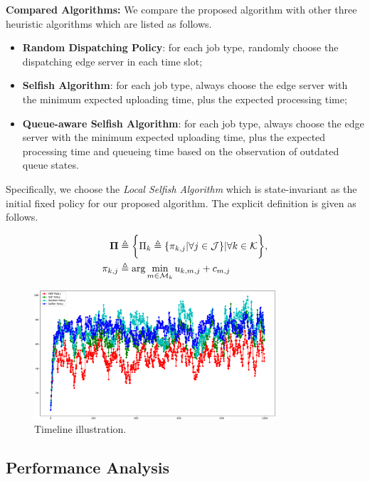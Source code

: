 \textbf{Compared Algorithms:}
We compare the proposed algorithm with other three heuristic algorithms which are listed as follows.
\begin{itemize}
    \item \textbf{Random Dispatching Policy}:
            for each job type, randomly choose the dispatching edge server in each time slot; 
    \item \textbf{Selfish Algorithm}:
            for each job type, always choose the edge server with the minimum expected uploading time, plus the expected processing time;
    \item \textbf{Queue-aware Selfish Algorithm}:
            for each job type, always choose the edge server with the minimum expected uploading time, plus the expected processing time and queueing time based on the observation of outdated queue states.
\end{itemize}
Specifically, we choose the \emph{Local Selfish Algorithm} which is state-invariant as the initial fixed policy for our proposed algorithm.
The explicit definition is given as follows.
\begin{policy}
    \begin{align}
        \boldsymbol{\Pi} &\triangleq \bigg\{ \Pi_{k}\triangleq\{\pi_{k,j}|\forall j\in\mathcal{J}\} |\forall k\in\mathcal{K} \bigg\},
        \\
        \pi_{k,j} &\triangleq \arg\min_{m\in\mathcal{M}_{k}} u_{k,m,j} + c_{m,j}
    \end{align} 
\end{policy}
\begin{figure}[htp!]
    \centering
    \includegraphics[width=0.80\textwidth]{images/Figure_1.pdf}
    \caption{Timeline illustration.}
    \label{fig:general_timeline}
\end{figure}

\subsection{Performance Analysis}
